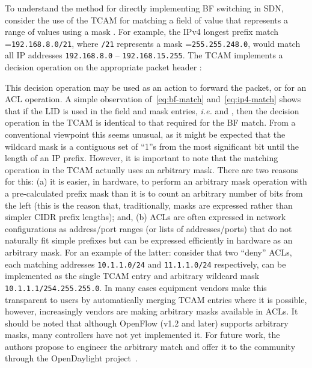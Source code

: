 \documentclass[conference]{IEEEtran}
\begin{document}
To understand the method for directly implementing BF switching in SDN, consider the use of the TCAM for matching a field of value  that represents a range of values using a mask . For example, the IPv4 longest prefix match =\texttt{192.168.8.0/21}, where \texttt{/21} represents a mask =\texttt{255.255.248.0}, would match all IP addresses \texttt{192.168.8.0} -- \texttt{192.168.15.255}. The TCAM implements a decision operation  on the appropriate packet header :

This decision operation may be used as an action to forward the packet, or for an ACL operation. A simple observation of~\eqref{eq:bf-match} and~\eqref{eq:ip4-match} shows that if the LID is used in the field and mask entries, \emph{i.e.}  and , then the decision operation in the TCAM is identical to that required for the BF match. From a conventional viewpoint this seems unusual, as it might be expected that the wildcard mask is a contiguous set of ``1''s from the most significant bit until the length of an IP prefix. However, it is important to note that the matching operation in the TCAM actually uses an arbitrary mask. There are two reasons for this: (a) it is easier, in hardware, to perform an arbitrary mask operation with a pre-calculated prefix mask than it is to count an arbitrary number of bits from the left (this is the reason that, traditionally, masks are expressed rather than simpler CIDR prefix lengths); and, (b) ACLs are often expressed in network configurations as address/port ranges (or lists of addresses/ports) that do not naturally fit simple prefixes but can be expressed efficiently in hardware as an arbitrary mask. For an example of the latter: consider that two ``deny'' ACLs, each matching addresses \texttt{10.1.1.0/24} and \texttt{11.1.1.0/24} respectively, can be implemented as the single TCAM entry and arbitrary wildcard mask \texttt{10.1.1.1/254.255.255.0}. In many cases equipment vendors make this transparent to users by automatically merging TCAM entries where it is possible, however, increasingly vendors are making arbitrary masks available in ACLs. It should be noted that although OpenFlow (v1.2 and later) supports arbitrary masks, many controllers have not yet implemented it. For future work, the authors propose to engineer the arbitrary match and offer it to the community through the OpenDaylight project~\cite{OpenDaylight}.
\end{document}
